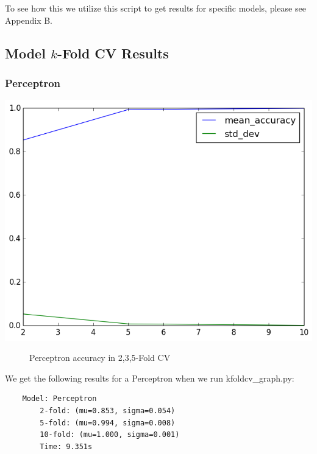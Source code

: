 \documentclass[fleqn]{article}
\begin{document}
    \noindent
    To see how this we utilize this script to get results for specific models, please see
    Appendix B.

    \subsection{Model $k$-Fold CV Results}
    \subsubsection{Perceptron}
    \begin{center}
        \includegraphics[scale=0.35]{model_accuracy_vs_folds_Perceptron.png}
        \begin{figure}[!h]
            \caption{Perceptron accuracy in 2,3,5-Fold CV}
        \end{figure}
    \end{center}
    We get the following results for a Perceptron when we run kfoldcv\_graph.py:
    \begin{lstlisting}
    Model: Perceptron
        2-fold: (mu=0.853, sigma=0.054)
        5-fold: (mu=0.994, sigma=0.008)
        10-fold: (mu=1.000, sigma=0.001)
        Time: 9.351s
    \end{lstlisting}
\end{document}
